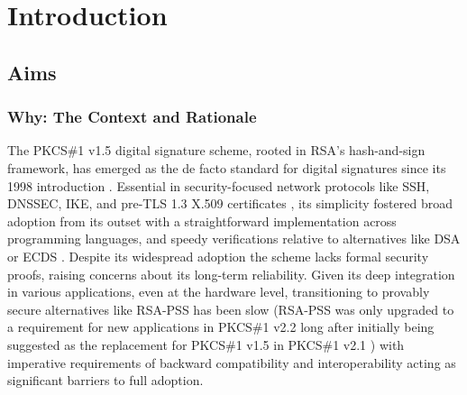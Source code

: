 \documentclass[]{final_report}
\theoremstyle{definition}
\begin{document}

\newpage


\chapter{Introduction}


\section{Aims}

\subsection{Why: The Context and Rationale}
The PKCS\#1 v1.5 digital signature scheme, rooted in RSA's hash-and-sign framework, has emerged as the de facto standard for digital signatures since its 1998 introduction \cite{rfc2313}. Essential in security-focused network protocols like SSH, DNSSEC, IKE, and pre-TLS 1.3 X.509 certificates \cite{schaad2005additional}, its simplicity fostered broad adoption from its outset with a straightforward implementation across programming languages, and speedy verifications relative to alternatives like DSA or ECDS  \cite{jager2018security}. 
Despite its widespread adoption the scheme lacks formal security proofs, raising concerns about its long-term reliability.
Given its deep integration in various applications, even at the hardware level, transitioning to provably secure \cite{bellare1996exact, jonsson2001security} alternatives like RSA-PSS has been slow (RSA-PSS was only upgraded to a requirement for new applications in PKCS\#1 v2.2 \cite{rfc8017} long after initially being suggested as the replacement for PKCS\#1 v1.5 in PKCS\#1 v2.1 \cite{rfc3447}) with imperative requirements of backward compatibility and interoperability acting as significant barriers to full adoption.
\end{document}
